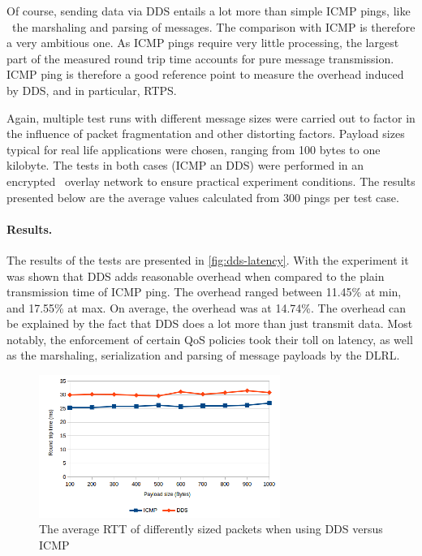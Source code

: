 Of course, sending data via DDS entails a lot more than simple ICMP pings, like \eg\ the marshaling and parsing of messages. The comparison with ICMP is therefore a very ambitious one. As ICMP pings require very little processing, the largest part of the measured round trip time accounts for pure message transmission. ICMP ping is therefore a good reference point to measure the overhead induced by DDS, and in particular, RTPS. 

Again, multiple test runs with different message sizes were carried out to factor in the influence of packet fragmentation and other distorting factors. Payload sizes typical for real life applications were chosen, ranging from 100 bytes to one kilobyte. The tests in both cases (ICMP an DDS) were performed in an encrypted \wnet\ overlay network to ensure practical experiment conditions. The results presented below are the average values calculated from 300 pings per test case.


\paragraph{Results.} 
The results of the tests are presented in \autoref{fig:dds-latency}. With the experiment it was shown that DDS adds reasonable overhead when compared to the plain transmission time of ICMP ping. The overhead ranged between 11.45\% at min, and 17.55\% at max. On average, the overhead was at 14.74\%. The overhead can be explained by the fact that DDS does a lot more than just transmit data. Most notably, the enforcement of certain QoS policies took their toll on latency, as well as the marshaling, serialization and parsing of message payloads by the DLRL.


\begin{figure}[htpb]
  \centering
  \includegraphics[width=0.7\textwidth]{figures/dds-latency}
  \caption[DDS latency benchmark results]{The average RTT of differently sized packets when using DDS versus ICMP}\label{fig:dds-latency}
\end{figure}

